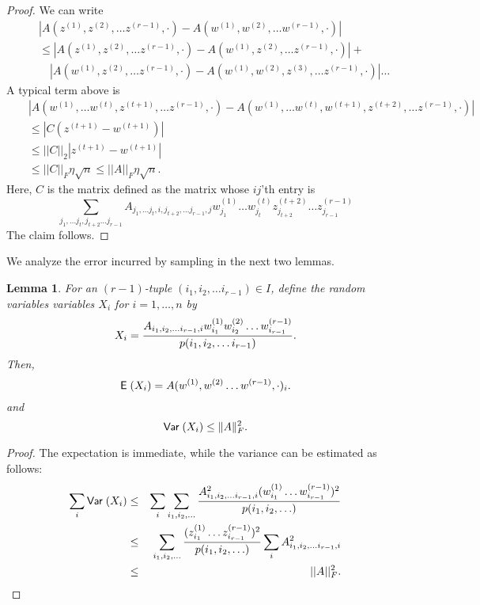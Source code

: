 \documentclass{book}
\newtheorem{lemma}[theorem]{Lemma}
\numberwithin{exercise}{chapter}
\begin{document}
\begin{proof}
We can write
\begin{eqnarray*}
&&\left| A(z^{(1)},z^{(2)},\ldots z^{(r-1)},\cdot ) -
A(w^{(1)},w^{(2)},\ldots w^{(r-1)},\cdot )\right| \\
&&\leq
\left| A(z^{(1)},z^{(2)},\ldots z^{(r-1)},\cdot ) -
A(w^{(1)},z^{(2)},\ldots z^{(r-1)},\cdot )\right| +\\
&& \quad \left| A(w^{(1)},z^{(2)},\ldots z^{(r-1)},\cdot ) -
A(w^{(1)},w^{(2)},z^{(3)},\ldots z^{(r-1)},\cdot )\right| \ldots
\end{eqnarray*}
A typical term above is
\begin{eqnarray*}
&&|A(w^{(1)},\ldots w^{(t)},z^{(t+1)}, \ldots z^{(r-1)},\cdot )-A(w^{(1)},\ldots w^{(t)},w^{(t+1)},z^{(t+2)},
\ldots z^{(r-1)},\cdot )|\\
&&\leq \left| C(z^{(t+1)}-w^{(t+1)})\right| \\
&&\leq ||C||_2 |z^{(t+1)}-w^{(t+1)}|\\
&&\leq ||C||_F \eta \sqrt n\leq ||A||_F\eta \sqrt n.
\end{eqnarray*}
Here, $C$ is the matrix defined as the matrix whose $ij$'th entry is
\[
\sum_{j_1, \ldots j_t, j_{t+2}\ldots j_{r-1}}
A_{j_1,\ldots j_t, i, j_{t+2},\ldots j_{r-1}, j}
w^{(1)}_{j_1}\ldots w^{(t)}_{j_t}z^{(t+2)}_{j_{t+2}}\ldots z^{(r-1)}_{j_{r-1}}
\]
The claim follows.
\end{proof}

We analyze the error incurred by sampling in the next two lemmas.

\begin{lemma}\label{lem:tensormoments}
For an $(r-1)$-tuple $(i_1,i_2,\ldots i_{r-1})
\in I$, define the random variables
variables $X_i$ for $i=1,\ldots,n$ by
$$X_i= {A_{i_1,i_2,\ldots i_{r-1},i}w^{(1)}_{i_1}w^{(2)}_{i_2}\ldots
w^{(r-1)}_{i_{r-1}}
\over p(i_1,i_2,\ldots i_{r-1})} .$$
Then,
\[
\hbox{{\sf E}\;}(X_i)=A(w^{(1)},w^{(2)}\ldots w^{(r-1)},\cdot)_i.
\]
and
\[
\hbox{\sf Var\;}(X_i) \le \|A\|_F^2.
\]
\end{lemma}
\begin{proof}
The expectation is immediate, while the variance can be estimated as follows:
\begin{eqnarray*}
\sum_{i} \hbox{\sf Var\;} (X_i) &\leq& \sum_i \sum_{i_1,i_2,\ldots }
{   A^2_{i_1,i_2,\ldots i_{r-1},i} (w^{(1)}_{i_1}\ldots w^{(r-1)}_{i_{r-1}})^2
\over p(i_1,i_2,\ldots ) }\\
&\leq& \sum_{i_1,i_2,\ldots }
{(z^{(1)}_{i_1}\ldots z^{(r-1)}_{i_{r-1}})^2
\over p(i_1,i_2,\ldots ) }
\sum_i
A^2_{i_1,i_2,\ldots i_{r-1},i}\\
&\leq& ||A||_F^2 .
\end{eqnarray*}
\end{proof}
\end{document}

